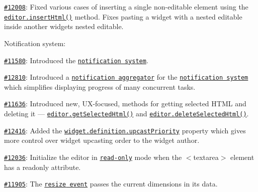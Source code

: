 \begin{DoxyItemize}
\begin{DoxyItemize}
\item \href{http://dev.ckeditor.com/ticket/12008}{\tt \#12008}\+: Fixed various cases of inserting a single non-\/editable element using the \href{http://docs.ckeditor.com/#!/api/CKEDITOR.editor-method-insertHtml}{\tt {\ttfamily editor.\+insert\+Html()}} method. Fixes pasting a widget with a nested editable inside another widget\textquotesingle{}s nested editable.
\end{DoxyItemize}
\item Notification system\+:
\begin{DoxyItemize}
\item \href{http://dev.ckeditor.com/ticket/11580}{\tt \#11580}\+: Introduced the \href{http://docs.ckeditor.com/#!/api/CKEDITOR.plugins.notification}{\tt notification system}.
\item \href{http://dev.ckeditor.com/ticket/12810}{\tt \#12810}\+: Introduced a \href{http://docs.ckeditor.com/#!/api/CKEDITOR.plugins.notificationAggregator}{\tt notification aggregator} for the \href{http://docs.ckeditor.com/#!/api/CKEDITOR.plugins.notification}{\tt notification system} which simplifies displaying progress of many concurrent tasks.
\end{DoxyItemize}
\item \href{http://dev.ckeditor.com/ticket/11636}{\tt \#11636}\+: Introduced new, U\+X-\/focused, methods for getting selected H\+T\+ML and deleting it --- \href{http://docs.ckeditor.com/#!/api/CKEDITOR.editor-method-getSelectedHtml}{\tt {\ttfamily editor.\+get\+Selected\+Html()}} and \href{http://docs.ckeditor.com/#!/api/CKEDITOR.editor-method-getSelectedHtml}{\tt {\ttfamily editor.\+delete\+Selected\+Html()}}.
\item \href{http://dev.ckeditor.com/ticket/12416}{\tt \#12416}\+: Added the \href{http://docs.ckeditor.com/#!/api/CKEDITOR.plugins.widget.definition-property-upcastPriority}{\tt {\ttfamily widget.\+definition.\+upcast\+Priority}} property which gives more control over widget upcasting order to the widget author.
\item \href{http://dev.ckeditor.com/ticket/12036}{\tt \#12036}\+: Initialize the editor in \href{http://docs.ckeditor.com/#!/api/CKEDITOR.editor-property-readOnly}{\tt read-\/only} mode when the {\ttfamily $<$textarea$>$} element has a {\ttfamily readonly} attribute.
\item \href{http://dev.ckeditor.com/ticket/11905}{\tt \#11905}\+: The \href{http://docs.ckeditor.com/#!/api/CKEDITOR.editor-event-resize}{\tt {\ttfamily resize} event} passes the current dimensions in its data.

\end{DoxyItemize}

